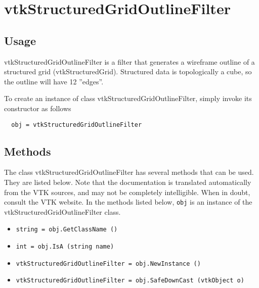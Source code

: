 \section{vtkStructuredGridOutlineFilter}

\subsection{Usage}

 vtkStructuredGridOutlineFilter is a filter that generates a wireframe 
 outline of a structured grid (vtkStructuredGrid). Structured data is 
 topologically a cube, so the outline will have 12 ''edges''.

To create an instance of class vtkStructuredGridOutlineFilter, simply
invoke its constructor as follows
\begin{verbatim}
  obj = vtkStructuredGridOutlineFilter
\end{verbatim}
\subsection{Methods}

The class vtkStructuredGridOutlineFilter has several methods that can be used.
  They are listed below.
Note that the documentation is translated automatically from the VTK sources,
and may not be completely intelligible.  When in doubt, consult the VTK website.
In the methods listed below, \verb|obj| is an instance of the vtkStructuredGridOutlineFilter class.
\begin{itemize}
\item  \verb|string = obj.GetClassName ()|

\item  \verb|int = obj.IsA (string name)|

\item  \verb|vtkStructuredGridOutlineFilter = obj.NewInstance ()|

\item  \verb|vtkStructuredGridOutlineFilter = obj.SafeDownCast (vtkObject o)|

\end{itemize}
